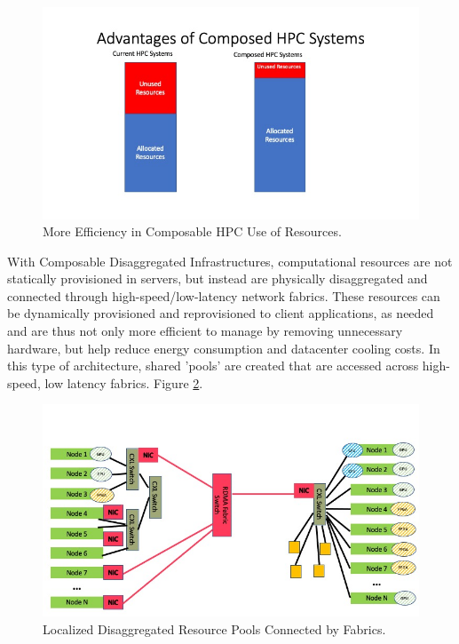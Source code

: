 \begin{figure}
\centerline{\includegraphics[width=\columnwidth]{Slide3.jpeg}}
\caption{More Efficiency in Composable HPC Use of Resources.} 
\label{fig:stranded}
\end{figure}

With Composable Disaggregated Infrastructures, computational resources are not statically provisioned in servers, but instead are physically disaggregated and connected through high-speed/low-latency network fabrics.  These resources can be dynamically provisioned and reprovisioned to client applications, as needed and are thus not only more efficient to manage by removing unnecessary hardware, but help reduce energy consumption and datacenter cooling costs.  In this type of architecture, shared 'pools' are created that are accessed across high-speed, low latency fabrics. Figure \ref{fig:Pools}. 


\begin{figure}
\centerline{\includegraphics[width=\columnwidth]{pools2.jpeg}}
\caption{Localized Disaggregated Resource Pools Connected by Fabrics.} 
\label{fig:Pools}
\end{figure}
  
